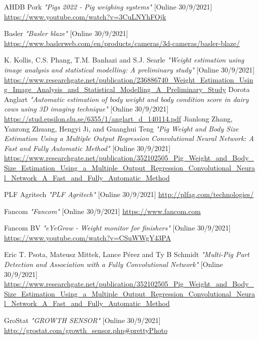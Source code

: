 \documentclass[12pt,a4paper]{article}
\begin{document}
\begin{thebibliography}{5}

    AHDB Pork \emph{"Pigs 2022 - Pig weighing systems"} [Online 30/9/2021]
    \url{https://www.youtube.com/watch?v=3CuLNYhFOjk}
    
    Basler \emph{"Basler blaze"} [Online 30/9/2021]
    \url{https://www.baslerweb.com/en/products/cameras/3d-cameras/basler-blaze/}

    K. Kollis, C.S. Phang, T.M. Banhazi and S.J. Searle \emph{"Weight estimation using image analysis and
    statistical modelling: A preliminary study"} [Online 30/9/2021]
    \url{https://www.researchgate.net/publication/236886740_Weight_Estimation_Using_Image_Analysis_and_Statistical_Modelling_A_Preliminary_Study}
    Dorota Anglart \emph{"Automatic estimation of body weight and body condition score in dairy cows using 3D imaging technique"} [Online 30/9/2021]
    \url{https://stud.epsilon.slu.se/6355/1/anglart_d_140114.pdf}
    Jianlong Zhang, Yanrong Zhuang, Hengyi Ji, and Guanghui Teng \emph{"Pig Weight and Body Size Estimation Using a Multiple Output Regression Convolutional Neural Network: A Fast and Fully Automatic Method"} [Online 30/9/2021]
    \url{https://www.researchgate.net/publication/352102505_Pig_Weight_and_Body_Size_Estimation_Using_a_Multiple_Output_Regression_Convolutional_Neural_Network_A_Fast_and_Fully_Automatic_Method}
    
    PLF Agritech \emph{"PLF Agritech"} [Online 30/9/2021]
    \url{http://plfag.com/technologies/}
    
    Fancom \emph{"Fancom"} [Online 30/9/2021]
    \url{https://www.fancom.com}

    Fancom BV \emph{"eYeGrow - Weight monitor for finishers"} [Online 30/9/2021]
    \url{https://www.youtube.com/watch?v=CSuWWgY43PA}    

    Eric T. Psota, Mateusz Mittek, Lance Pérez and Ty B Schmidt \emph{"Multi-Pig Part Detection and Association with a Fully Convolutional Network"} [Online 30/9/2021]
    \url{https://www.researchgate.net/publication/352102505_Pig_Weight_and_Body_Size_Estimation_Using_a_Multiple_Output_Regression_Convolutional_Neural_Network_A_Fast_and_Fully_Automatic_Method}
    
    GroStat \emph{"GROWTH SENSOR"} [Online 30/9/2021]
    \url{http://grostat.com/growth_sensor.php#prettyPhoto}


\end{thebibliography}
\end{document}
